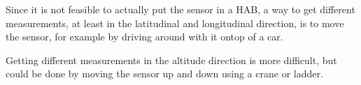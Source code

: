 \begin{enumerate}
\begin{enumerate}[(a)]
        Since it is not feasible to actually put the sensor in a HAB, a way to get different measurements, at least in the latitudinal and longitudinal direction, is to move the sensor, for example by driving around with it ontop of a car.

        Getting different measurements in the altitude direction is more difficult, but could be done by moving the sensor up and down using a crane or ladder.
    \end{enumerate}
\end{enumerate}






